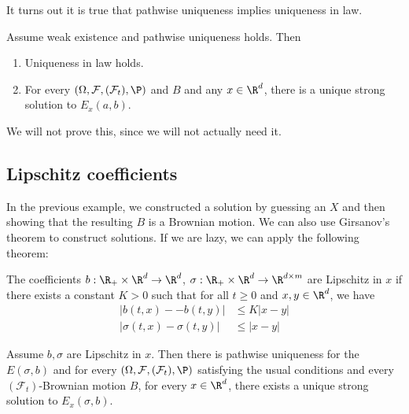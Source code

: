 \documentclass[a4paper]{article}
\begin{document}
It turns out it is true that pathwise uniqueness implies uniqueness in law.
\begin{thm}
  Assume weak existence and pathwise uniqueness holds. Then
  \begin{enumerate}
    \item Uniqueness in law holds.
    \item For every $(\Omega, \mathcal{F}, (\mathcal{F}_t), \P)$ and $B$ and any $x \in \R^d$, there is a unique strong solution to $E_x(a, b)$.\fakeqed
  \end{enumerate}
\end{thm}
We will not prove this, since we will not actually need it.

\subsection{Lipschitz coefficients}
In the previous example, we constructed a solution by guessing an $X$ and then showing that the resulting $B$ is a Brownian motion. We can also use Girsanov's theorem to construct solutions. If we are lazy, we can apply the following theorem:
\begin{defi}
  The coefficients $b: \R_+ \times \R^d \to \R^d$, $\sigma: \R_+ \times \R^d \to \R^{d \times m}$ are Lipschitz in $x$ if there exists a constant $K > 0$ such that for all $t \geq 0$ and $x, y \in \R^d$, we have
  \begin{align*}
    |b(t, x) -- b(t, y)| &\leq K|x - y|\\
    |\sigma(t, x) - \sigma(t, y)| &\leq |x - y|
  \end{align*}
\end{defi}

\begin{thm}
  Assume $b, \sigma$ are Lipschitz in $x$. Then there is pathwise uniqueness for the $E(\sigma, b)$ and for every $(\Omega, \mathcal{F}, (\mathcal{F}_t), \P)$ satisfying the usual conditions and every $(\mathcal{F}_t)$-Brownian motion $B$, for every $x \in \R^d$, there exists a unique strong solution to $E_x(\sigma, b)$.
\end{thm}
\end{document}
